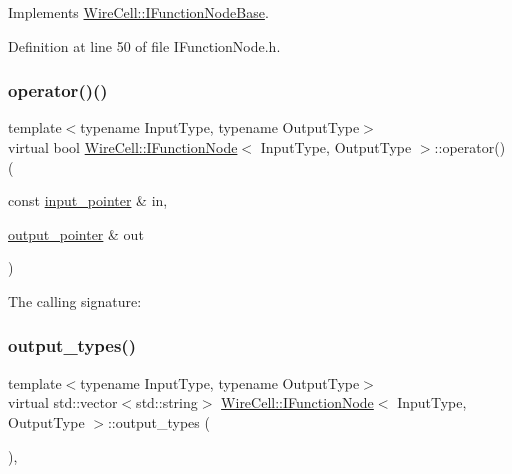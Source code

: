 Implements \hyperlink{class_wire_cell_1_1_i_function_node_base_a8928d96f5d2030a52a490cf1d71c096f}{Wire\+Cell\+::\+I\+Function\+Node\+Base}.



Definition at line 50 of file I\+Function\+Node.\+h.

\mbox{\label{class_wire_cell_1_1_i_function_node_ab17a0438f6545e43efecd7b34e539e5a}} 
\subsubsection{\texorpdfstring{operator()()}{operator()()}\hspace{0.1cm}{\footnotesize\ttfamily [2/2]}}
{\footnotesize\ttfamily template$<$typename Input\+Type, typename Output\+Type$>$ \\
virtual bool \hyperlink{class_wire_cell_1_1_i_function_node}{Wire\+Cell\+::\+I\+Function\+Node}$<$ Input\+Type, Output\+Type $>$\+::operator() (\begin{DoxyParamCaption}\item[{const \hyperlink{class_wire_cell_1_1_i_function_node_a55c0946156df9b712b8ad1a0b59b2db6}{input\+\_\+pointer} \&}]{in,  }\item[{\hyperlink{class_wire_cell_1_1_i_function_node_afc02f1ec60d31aacddf64963f9ca650b}{output\+\_\+pointer} \&}]{out }\end{DoxyParamCaption})\hspace{0.3cm}{\ttfamily [pure virtual]}}



The calling signature\+: 

\mbox{\label{class_wire_cell_1_1_i_function_node_aaabdb086807eaa14b9a5d7f00ee290de}} 
\subsubsection{\texorpdfstring{output\+\_\+types()}{output\_types()}}
{\footnotesize\ttfamily template$<$typename Input\+Type, typename Output\+Type$>$ \\
virtual std\+::vector$<$std\+::string$>$ \hyperlink{class_wire_cell_1_1_i_function_node}{Wire\+Cell\+::\+I\+Function\+Node}$<$ Input\+Type, Output\+Type $>$\+::output\+\_\+types (\begin{DoxyParamCaption}{ }\end{DoxyParamCaption})\hspace{0.3cm}{\ttfamily [inline]}, {\ttfamily [virtual]}}



